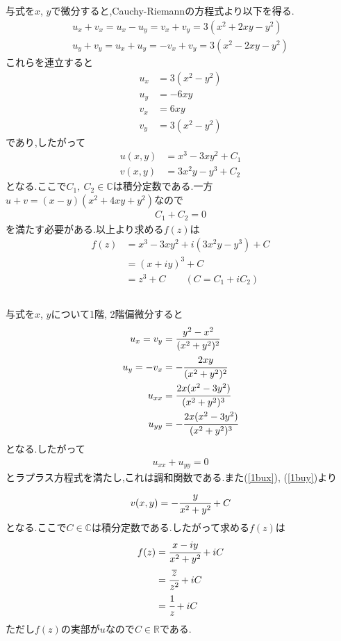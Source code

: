 \setcounter{section}{1}
\subsection{}
与式を$x$, $y$で微分すると,Cauchy-Riemannの方程式より以下を得る.
\begin{align}
  \label{1a_x}
  u_x+v_x=u_x-u_y=v_x+v_y=3(x^2+2xy-y^2)\\
  \label{1a_y}
  u_y+v_y=u_x+u_y=-v_x+v_y=3(x^2-2xy-y^2)
\end{align}
これらを連立すると
\begin{subequations}
  \begin{align}
    u_x&=3(x^2-y^2)\\
    u_y&=-6xy\\
    v_x&=6xy\\
    v_y&=3(x^2-y^2)
  \end{align}
\end{subequations}
であり,したがって
\begin{align}
  u(x,y)&=x^3-3xy^2+C_1\\
  v(x,y)&=3x^2y-y^3+C_2
\end{align}
となる.ここで$C_1,\ C_2\in\mathbb{C}$は積分定数である.一方$u+v=(x-y)(x^2+4xy+y^2)$なので
\begin{align}
  C_1+C_2=0
\end{align}
を満たす必要がある.以上より求める$f(z)$は
\begin{align*}
  f(z)&=x^3-3xy^2+i(3x^2y-y^3)+C\\
  &=(x+iy)^3+C\\
  &=z^3+C\qquad(C=C_1+iC_2)
\end{align*}
\newpage
\subsection{}
与式を$x$, $y$について1階, 2階偏微分すると
\begin{subequations}
\begin{align}
  \label{1bux}
  u_x=v_y&=\frac{y^2-x^2}{(x^2+y^2)^2}\\
  \label{1buy}
  u_y=-v_x&=-\cfrac{2xy}{(x^2+y^2)^2}\\
  u_{xx}&=\cfrac{2x(x^2-3y^2)}{(x^2+y^2)^3}\\
  u_{yy}&=-\cfrac{2x(x^2-3y^2)}{(x^2+y^2)^3}
\end{align}
\end{subequations}
となる.したがって
\begin{align}
  u_{xx}+u_{yy}=0
\end{align}
とラプラス方程式を満たし,これは調和関数である.また(\ref{1bux}), (\ref{1buy})より
\begin{align}
  v(x,y)=-\cfrac{y}{x^2+y^2}+C\\
\end{align}
となる.ここで$C\in\mathbb{C}$は積分定数である.したがって求める$f(z)$は
\begin{align*}
  f(z)&=\cfrac{x-iy}{x^2+y^2}+iC\\
  &=\cfrac{\overline{z}}{z^2}+iC\\
  &=\cfrac{1}{z}+iC
\end{align*}
ただし$f(z)$の実部が$u$なので$C\in\mathbb{R}$である.
\newpage